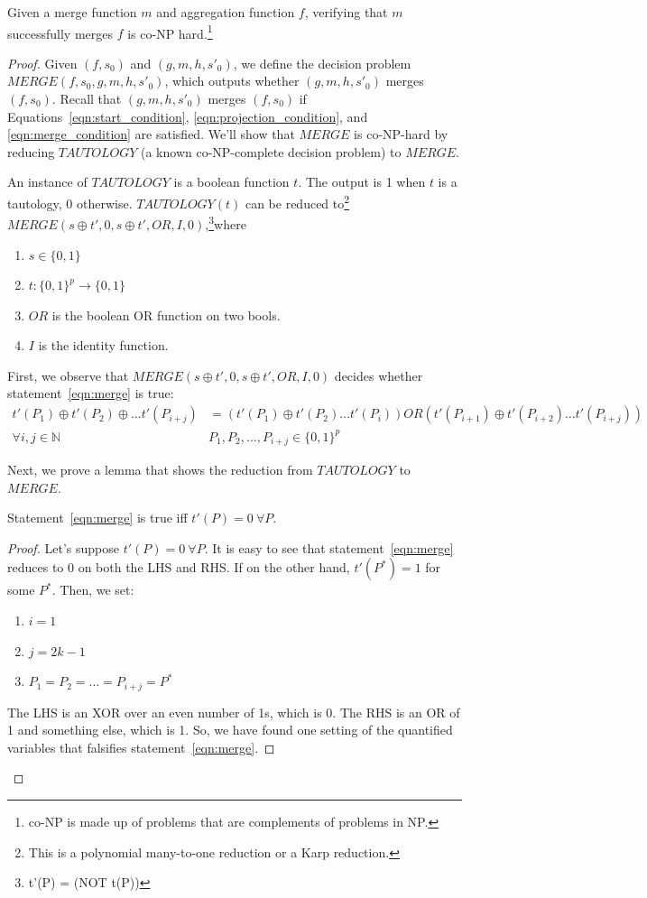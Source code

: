 \begin{theorem}
Given a merge function $m$ and aggregation function $f$, verifying that $m$
successfully merges $f$ is co-NP hard.\footnote{co-NP is made up of problems
that are complements of problems in NP.}
\end{theorem}
\begin{proof}
Given $(f, s_0)$ and $(g, m, h, s'_0)$, we define the decision problem
$MERGE(f, s_0, g, m, h, s'_0)$, which outputs whether $(g, m, h, s'_0)$ merges
$(f, s_0)$. Recall that $(g, m, h, s'_0)$ merges $(f, s_0)$ if
Equations~\ref{eqn:start_condition}, \ref{eqn:projection_condition}, and
\ref{eqn:merge_condition} are satisfied. We'll show that $MERGE$ is co-NP-hard
by reducing $TAUTOLOGY$ (a known co-NP-complete decision problem) to $MERGE$.

An instance of $TAUTOLOGY$ is a boolean function $t$. The output is 1 when $t$ is a
tautology, 0 otherwise. $TAUTOLOGY(t)$ can be reduced to\footnote{This is a
polynomial many-to-one reduction or a Karp reduction.} $MERGE(s \oplus t', 0, s
\oplus t', OR, I, 0)$,\footnote{t'(P) = (NOT t(P))}where
\begin{enumerate}
\item $s \in \{0, 1\}$
\item $t : \{0, 1\}^p \rightarrow \{0, 1\}$
\item $OR$ is the boolean OR function on two bools.
\item $I$ is the identity function.
\end{enumerate}

First, we observe that $MERGE(s \oplus t', 0, s \oplus t', OR, I, 0)$ decides whether statement~\ref{eqn:merge} is true:
\begin{align}
t'(P_1) \oplus t'(P_2) \oplus \dots t'(P_{i+j}) & = (t'(P_1) \oplus t'(P_2) \dots t'(P_{i})) OR (t'(P_{i+1}) \oplus t'(P_{i+2}) \dots t'(P_{i+j})) \label{eqn:merge} \\
\forall i, j \in \mathbb{N} \ \ & P_1, P_2, \dots, P_{i+j} \in \{0, 1\}^p \nonumber
\end{align}

Next, we prove a lemma that shows the reduction from $TAUTOLOGY$ to $MERGE$.

\begin{lemma}
Statement~\ref{eqn:merge} is true iff $t'(P) = 0 \ \forall P$.
\end{lemma}
\begin{proof}
Let's suppose $t'(P) = 0 \ \forall P$. It is easy to see that statement~\ref{eqn:merge} reduces to 0 on both the LHS and RHS. If on the other hand, $t'(P^*) = 1$ for some $P^*$. Then, we set:
\begin{enumerate}
\item $i = 1$
\item $j = 2k - 1$
\item $P_1 = P_2 = \dots = P_{i+j} = P^*$
\end{enumerate}
The LHS is an XOR over an even number of 1s, which is 0. The RHS is an OR of 1
and something else, which is 1. So, we have found one setting of the quantified
variables that falsifies statement~\ref{eqn:merge}.
\vspace{\baselineskip}
\end{proof}


\end{proof}
